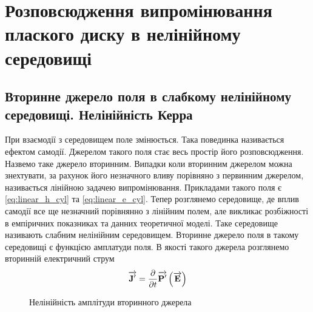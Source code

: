 \chapter{Розповсюдження випромінювання плаского диску в нелінійному середовищі}
\label{ch:nonlinear}

\section{Вторинне джерело поля в слабкому нелінійному середовищі. 
Нелінійність Керра}

При взаємодії з середовищем поле змінюється. Така повединка називається ефектом 
самодії. Джерелом такого поля стає весь простір його розповсюдження. Назвемо 
таке джерело вторинним. Випадки коли вторинним джерелом можна знехтувати, за 
рахунок його незначного вливу порівняно з первинним джерелом, називається 
лінійною задачею випромінювання. Прикладами такого поля є 
\eqref{eq:linear_h_cyl} та \eqref{eq:linear_e_cyl}. Тепер розглянемо 
середовище, де вплив самодії все ще незначний порівнянно з лінійним полем, але
викликає розбіжності в емпіричних показниках та данних теоретичної моделі. 
Таке середовище називають слабним нелінійним середовищем. Вторинне джерело 
поля в такому середовищі є функцією амплатуди поля. В якості такого джерела 
розглянемо вторинній електричний струм
%
\begin{equation*} 
\overrightarrow{\mathbf J^\prime} = \frac{\partial }{\partial t} \overrightarrow{\mathbf P^\prime} \left( \overrightarrow{\mathbf E} \right)
\end{equation*}
%
\begin{figure}
    \centering
    \qquad
    \caption{Нелінійність амплітуди вторинного джерела}
    \label{fig:example}%
\end{figure}


